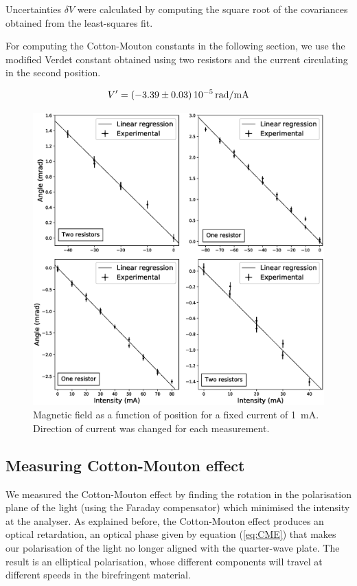 \documentclass[11pt,a4paper]{article}
\begin{document}
Uncertainties $\delta V$ were calculated by computing the square root of the covariances obtained from the least-squares fit.

For computing the Cotton-Mouton constants in the following section, we use the modified Verdet constant obtained using two resistors and the current circulating in the second position.

\begin{equation}\label{val:verdet}
V'=\SI{-3.39\pm0.03}{\num{e-5}.\radian/\mA}
\end{equation}

\begin{figure}[H]
\centering
\includegraphics[width=\textwidth]{Angle_diff_intensity2.eps}
\caption{Magnetic field as a function of position for a fixed current of \SI{1}{\mA}. Direction of current was changed for each measurement.}
\label{fig:FaradayAngle}
\end{figure}

\subsection{Measuring Cotton-Mouton effect}

We measured the Cotton-Mouton effect by finding the rotation in the polarisation plane of the light (using the Faraday compensator) which minimised the intensity at the analyser. As explained before, the Cotton-Mouton effect produces an optical retardation, an optical phase given by equation (\ref{eq:CME}) that makes our polarisation of the light no longer aligned with the quarter-wave plate. The result is an elliptical polarisation, whose different components will travel at different speeds in the birefringent material.
\end{document}
